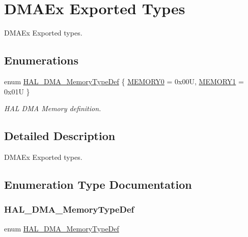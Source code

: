 \hypertarget{group___d_m_a_ex___exported___types}{}\section{D\+M\+A\+Ex Exported Types}
\label{group___d_m_a_ex___exported___types}


D\+M\+A\+Ex Exported types.  


\subsection*{Enumerations}
\begin{DoxyCompactItemize}
\item 
enum \mbox{\hyperlink{group___d_m_a_ex___exported___types_ga9cec283a461e47eda968838c35fd6eed}{H\+A\+L\+\_\+\+D\+M\+A\+\_\+\+Memory\+Type\+Def}} \{ \mbox{\hyperlink{group___d_m_a_ex___exported___types_gga9cec283a461e47eda968838c35fd6eeda2dec05a318eee29371114f1a8f6fe3f4}{M\+E\+M\+O\+R\+Y0}} = 0x00U, 
\mbox{\hyperlink{group___d_m_a_ex___exported___types_gga9cec283a461e47eda968838c35fd6eeda06080dfa68716b5bbf425d9232b144c3}{M\+E\+M\+O\+R\+Y1}} = 0x01U
 \}
\begin{DoxyCompactList}\small\item\em H\+AL D\+MA Memory definition. \end{DoxyCompactList}\end{DoxyCompactItemize}


\subsection{Detailed Description}
D\+M\+A\+Ex Exported types. 



\subsection{Enumeration Type Documentation}
\mbox{\label{group___d_m_a_ex___exported___types_ga9cec283a461e47eda968838c35fd6eed}} 
\subsubsection{\texorpdfstring{HAL\_DMA\_MemoryTypeDef}{HAL\_DMA\_MemoryTypeDef}}
{\footnotesize\ttfamily enum \mbox{\hyperlink{group___d_m_a_ex___exported___types_ga9cec283a461e47eda968838c35fd6eed}{H\+A\+L\+\_\+\+D\+M\+A\+\_\+\+Memory\+Type\+Def}}}



